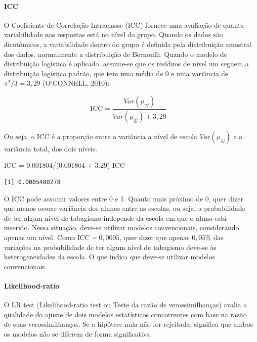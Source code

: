 \documentclass[
]{article}
\let\oldparagraph\paragraph
\renewcommand{\paragraph}[1]{\oldparagraph{#1}\mbox{}}
\newenvironment{Shaded}{\begin{snugshade}}{\end{snugshade}}
\newcommand{\FloatTok}[1]{\textcolor[rgb]{0.68,0.00,0.00}{#1}}
\newcommand{\NormalTok}[1]{\textcolor[rgb]{0.00,0.23,0.31}{#1}}
\newcommand{\OtherTok}[1]{\textcolor[rgb]{0.00,0.23,0.31}{#1}}
\newcommand{\SpecialCharTok}[1]{\textcolor[rgb]{0.37,0.37,0.37}{#1}}
\begin{document}
\hypertarget{icc}{%
\paragraph{ICC}\label{icc}}

O Coeficiente de Correlação Intraclasse (ICC) fornece uma avaliação de
quanta variabilidade nas respostas está no nível do grupo. Quando os
dados são dicotômicos, a variabilidade dentro do grupo é definida pela
distribuição amostral dos dados, normalmente a distribuição de
Bernoulli. Quando o modelo de distribuição logística é aplicado,
assume-se que os resíduos de nível um seguem a distribuição logística
padrão, que tem uma média de 0 e uma variância de \(\pi^2/3 = 3,29\)
(O'CONNELL, 2010):

\[
\text{ICC} = \frac{Var(\mu_{qj})}{Var(\mu_{qj}) + 3,29}
\]

Ou seja, o ICC é a proporção entre a variância a nível de escola
\(Var(\mu_{qj})\) e a variância total, dos dois níveis.

\begin{Shaded}
\begin{Highlighting}[]
\NormalTok{ICC }\OtherTok{=} \FloatTok{0.001804}\SpecialCharTok{/}\NormalTok{(}\FloatTok{0.001804} \SpecialCharTok{+} \FloatTok{3.29}\NormalTok{)}
\NormalTok{ICC}
\end{Highlighting}
\end{Shaded}

\begin{verbatim}
[1] 0.0005480278
\end{verbatim}

O ICC pode assumir valores entre 0 e 1. Quanto mais próximo de 0, quer
dizer que menos ocorre variância dos alunos entre as escolas, ou seja, a
probabilidade de ter algum nível de tabagismo independe da escola em que
o aluno está inserido. Nessa situação, deve-se utilizar modelos
convencionais, considerando apenas um nível. Como
\(\text{ICC} = 0,0005\), quer dizer que apenas \(0,05\%\) das variações
na probabilidade de ter algum nível de tabagismo deve-se às
heterogeneidades da escola. O que indica que deve-se utilizar modelos
convencionais.

\hypertarget{likelihood-ratio}{%
\paragraph{Likelihood-ratio}\label{likelihood-ratio}}

O LR test (Likelihood-ratio test ou Teste da razão de verossimilhanças)
avalia a qualidade do ajuste de dois modelos estatísticos concorrentes
com base na razão de suas verossimilhanças. Se a hipótese nula não for
rejeitada, significa que ambos os modelos não se diferem de forma
significativa.
\end{document}
